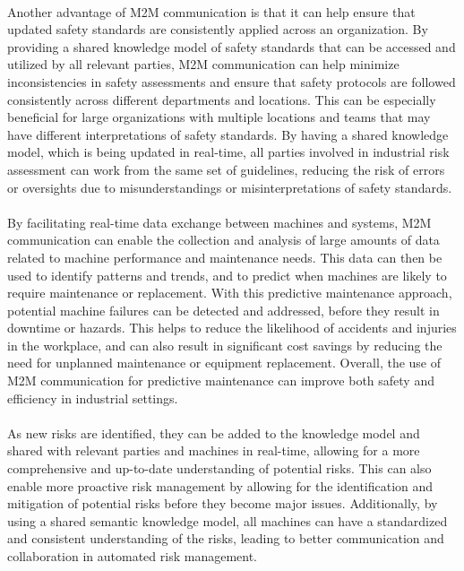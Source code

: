 \paragraph{} Another advantage of M2M communication is that it can help ensure that updated safety standards are consistently applied across an organization. By providing a shared knowledge model of safety standards that can be accessed and utilized by all relevant parties, M2M communication can help minimize inconsistencies in safety assessments and ensure that safety protocols are followed consistently across different departments and locations. This can be especially beneficial for large organizations with multiple locations and teams that may have different interpretations of safety standards. By having a shared knowledge model, which is being updated in real-time, all parties involved in industrial risk assessment can work from the same set of guidelines, reducing the risk of errors or oversights due to misunderstandings or misinterpretations of safety standards.

\paragraph{} By facilitating real-time data exchange between machines and systems, M2M communication can enable the collection and analysis of large amounts of data related to machine performance and maintenance needs. This data can then be used to identify patterns and trends, and to predict when machines are likely to require maintenance or replacement. With this predictive maintenance approach, potential machine failures can be detected and addressed, before they result in downtime or hazards. This helps to reduce the likelihood of accidents and injuries in the workplace, and can also result in significant cost savings by reducing the need for unplanned maintenance or equipment replacement. Overall, the use of M2M communication for predictive maintenance can improve both safety and efficiency in industrial settings.

\paragraph{} As new risks are identified, they can be added to the knowledge model and shared with relevant parties and machines in real-time, allowing for a more comprehensive and up-to-date understanding of potential risks. This can also enable more proactive risk management by allowing for the identification and mitigation of potential risks before they become major issues. Additionally, by using a shared semantic knowledge model, all machines can have a standardized and consistent understanding of the risks, leading to better communication and collaboration in automated risk management.

